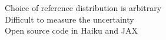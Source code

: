 \documentclass[preview]{standalone}
\begin{document}
Choice of reference distribution is arbitrary\\Difficult to measure the uncertainty\\Open source code in Haiku and JAX 🤔\\
\end{document}

